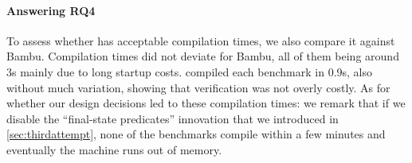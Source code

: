 \paragraph{Answering RQ4}
To assess whether \VericertHyper{} has acceptable compilation times, we also
compare it against Bambu.  Compilation times did not deviate for Bambu, all of
them being around 3s mainly due to long startup costs. \VericertHyper{} compiled
each benchmark in 0.9s, also without much variation, showing that verification
was not overly costly.  As for whether our design decisions led to these
compilation times: we remark that if we disable the \enquote{final-state
  predicates} innovation that we introduced in \cref{sec:thirdattempt}, none of
the benchmarks compile within a few minutes and eventually the machine runs out
of memory.





